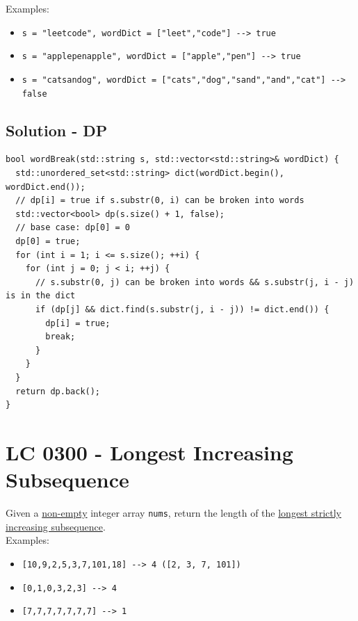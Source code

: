 Examples:
\begin{itemize}
	\item {\colorbox{CodeBackground}{\lstinline|s = "leetcode", wordDict = ["leet","code"] --> true|}}
	\item {\colorbox{CodeBackground}{\lstinline|s = "applepenapple", wordDict = ["apple","pen"] --> true|}}
	\item {\colorbox{CodeBackground}{\lstinline|s = "catsandog", wordDict = ["cats","dog","sand","and","cat"] --> false|}}
\end{itemize}

\subsection*{Solution - DP}
\begin{lstlisting}
bool wordBreak(std::string s, std::vector<std::string>& wordDict) {
  std::unordered_set<std::string> dict(wordDict.begin(), wordDict.end());
  // dp[i] = true if s.substr(0, i) can be broken into words
  std::vector<bool> dp(s.size() + 1, false);
  // base case: dp[0] = 0
  dp[0] = true;
  for (int i = 1; i <= s.size(); ++i) {
    for (int j = 0; j < i; ++j) {
      // s.substr(0, j) can be broken into words && s.substr(j, i - j) is in the dict
      if (dp[j] && dict.find(s.substr(j, i - j)) != dict.end()) {
        dp[i] = true;
        break;
      }
    }
  }
  return dp.back();
}
\end{lstlisting}

\section{LC 0300 - Longest Increasing Subsequence}\label{lc0300}
Given a \ul{non-empty} integer array {\colorbox{CodeBackground}{\lstinline|nums|}}, return the length of the \ul{longest strictly increasing subsequence}.\\

Examples:
\begin{itemize}
	\item {\colorbox{CodeBackground}{\lstinline|[10,9,2,5,3,7,101,18] --> 4 ([2, 3, 7, 101])|}}
	\item {\colorbox{CodeBackground}{\lstinline|[0,1,0,3,2,3] --> 4|}}
	\item {\colorbox{CodeBackground}{\lstinline|[7,7,7,7,7,7,7] --> 1|}}
\end{itemize}

